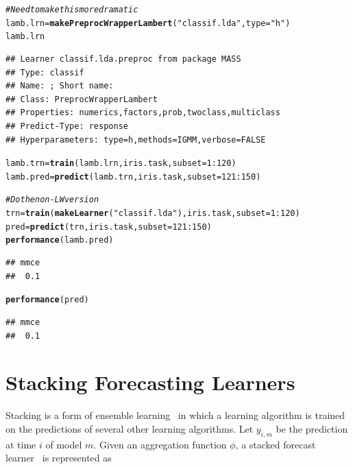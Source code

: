\documentclass{article}\usepackage[]{graphicx}\usepackage[]{color}
\makeatletter
\newcommand{\hlnum}[1]{\textcolor[rgb]{0.686,0.059,0.569}{#1}}%
\newcommand{\hlstr}[1]{\textcolor[rgb]{0.192,0.494,0.8}{#1}}%
\newcommand{\hlcom}[1]{\textcolor[rgb]{0.678,0.584,0.686}{\textit{#1}}}%
\newcommand{\hlopt}[1]{\textcolor[rgb]{0,0,0}{#1}}%
\newcommand{\hlstd}[1]{\textcolor[rgb]{0.345,0.345,0.345}{#1}}%
\newcommand{\hlkwb}[1]{\textcolor[rgb]{0.69,0.353,0.396}{#1}}%
\newcommand{\hlkwc}[1]{\textcolor[rgb]{0.333,0.667,0.333}{#1}}%
\newcommand{\hlkwd}[1]{\textcolor[rgb]{0.737,0.353,0.396}{\textbf{#1}}}%
\newenvironment{kframe}{%
 \def\at@end@of@kframe{}%
 \ifinner\ifhmode%
  \def\at@end@of@kframe{\end{minipage}}%
  \begin{minipage}{\columnwidth}%
 \fi\fi%
 \def\FrameCommand##1{\hskip\@totalleftmargin \hskip-\fboxsep
 \colorbox{shadecolor}{##1}\hskip-\fboxsep
     \hskip-\linewidth \hskip-\@totalleftmargin \hskip\columnwidth}%
 \MakeFramed {\advance\hsize-\width
   \@totalleftmargin\z@ \linewidth\hsize
   \@setminipage}}%
 {\par\unskip\endMakeFramed%
 \at@end@of@kframe}
\newenvironment{knitrout}{}{} %
\theoremstyle{definition}
\makeatother
\begin{document}
\begin{knitrout}
\color{fgcolor}\begin{kframe}
\begin{alltt}
\hlcom{# Need to make this more dramatic}
\hlstd{lamb.lrn} \hlkwb{=} \hlkwd{makePreprocWrapperLambert}\hlstd{(}\hlstr{"classif.lda"}\hlstd{,} \hlkwc{type} \hlstd{=} \hlstr{"h"}\hlstd{)}
\hlstd{lamb.lrn}
\end{alltt}
\begin{verbatim}
## Learner classif.lda.preproc from package MASS
## Type: classif
## Name: ; Short name: 
## Class: PreprocWrapperLambert
## Properties: numerics,factors,prob,twoclass,multiclass
## Predict-Type: response
## Hyperparameters: type=h,methods=IGMM,verbose=FALSE
\end{verbatim}
\begin{alltt}
\hlstd{lamb.trn} \hlkwb{=} \hlkwd{train}\hlstd{(lamb.lrn,iris.task,} \hlkwc{subset} \hlstd{=} \hlnum{1}\hlopt{:}\hlnum{120}\hlstd{)}
\hlstd{lamb.pred} \hlkwb{=} \hlkwd{predict}\hlstd{(lamb.trn, iris.task,} \hlkwc{subset} \hlstd{=} \hlnum{121}\hlopt{:}\hlnum{150}\hlstd{)}

\hlcom{# Do the non-LW version}
\hlstd{trn} \hlkwb{=} \hlkwd{train}\hlstd{(}\hlkwd{makeLearner}\hlstd{(}\hlstr{"classif.lda"}\hlstd{),iris.task,} \hlkwc{subset} \hlstd{=} \hlnum{1}\hlopt{:}\hlnum{120}\hlstd{)}
\hlstd{pred} \hlkwb{=} \hlkwd{predict}\hlstd{(trn, iris.task,} \hlkwc{subset} \hlstd{=} \hlnum{121}\hlopt{:}\hlnum{150}\hlstd{)}
\hlkwd{performance}\hlstd{(lamb.pred)}
\end{alltt}
\begin{verbatim}
## mmce 
##  0.1
\end{verbatim}
\begin{alltt}
\hlkwd{performance}\hlstd{(pred)}
\end{alltt}
\begin{verbatim}
## mmce 
##  0.1
\end{verbatim}
\end{kframe}
\end{knitrout}


\section{Stacking Forecasting Learners}

Stacking is a form of ensemble learning~\cite{ensembleOverview} in which a learning algorithm is trained on the predictions of several other learning algorithms. Let $y_{i,m}$ be the prediction at time $i$ of model $m$. Given an aggregation function $\phi$, a stacked forecast learner~\cite{combineForecast} is represented as
\end{document}
